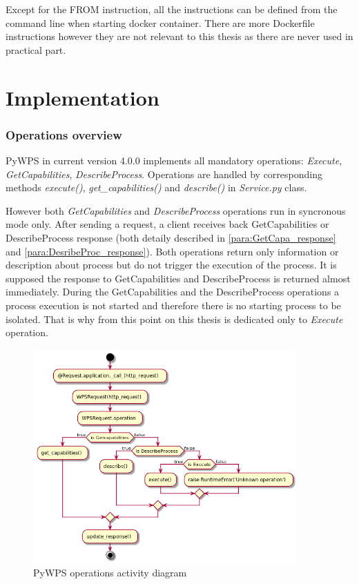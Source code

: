 \documentclass[12pt,a4paper]{article}
\begin{document}
Except for the FROM instruction, all the instructions can be defined from the command line when starting docker container. There are more Dockerfile instructions however they are not relevant to this thesis as there are never used in practical part.

\newpage
\part{Implementation}
\newpage
\section{Operations overview}
\label{sec:operations_ov}
PyWPS in current version 4.0.0 implements all mandatory operations: \textit{Execute}, \textit{GetCapabilities}, \textit{DescribeProcess}.
Operations are handled by corresponding methods \textit{execute()}, \textit{get\_capabilities()} and \textit{describe()} in \textit{Service.py} class. 

However both \textit{GetCapabilities} and \textit{DescribeProcess} operations run in syncronous mode only. After sending a request,
a client receives back GetCapabilities or DescribeProcess response (both detaily described in \ref{para:GetCapa_response} and \ref{para:DesribeProc_response}). Both operations return only information or description about process but do not trigger the
execution of the process. It is supposed the response to GetCapabilities and DescribeProcess is returned almost immediately.
During the GetCapabilities and the DescribeProcess operations a process execution is not started and therefore there is no
starting process to be isolated. That is why from this point on this thesis is dedicated only to \textit{Execute} operation.

\begin{figure}[h!]
\centering
\includegraphics[width=0.9\textwidth]{img/Diag_operations.png}
\caption{PyWPS operations activity diagram}
\label{fig:Diag_operations}
\end{figure}
\end{document}

